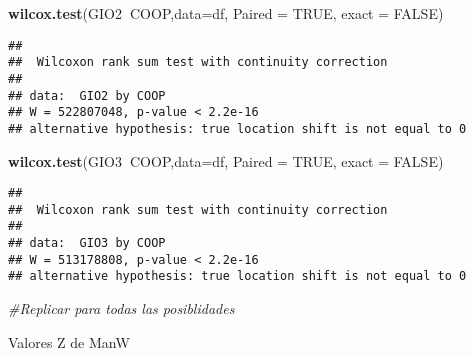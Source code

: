 \documentclass[
]{article}
\newenvironment{Shaded}{\begin{snugshade}}{\end{snugshade}}
\newcommand{\CommentTok}[1]{\textcolor[rgb]{0.56,0.35,0.01}{\textit{#1}}}
\newcommand{\DataTypeTok}[1]{\textcolor[rgb]{0.13,0.29,0.53}{#1}}
\newcommand{\KeywordTok}[1]{\textcolor[rgb]{0.13,0.29,0.53}{\textbf{#1}}}
\newcommand{\NormalTok}[1]{#1}
\newcommand{\OperatorTok}[1]{\textcolor[rgb]{0.81,0.36,0.00}{\textbf{#1}}}
\newcommand{\OtherTok}[1]{\textcolor[rgb]{0.56,0.35,0.01}{#1}}
\newcommand{\StringTok}[1]{\textcolor[rgb]{0.31,0.60,0.02}{#1}}
\begin{document}
\begin{Shaded}
\begin{Highlighting}[]
\KeywordTok{wilcox.test}\NormalTok{(GIO2}\OperatorTok{~}\NormalTok{COOP,}\DataTypeTok{data=}\NormalTok{df, }\DataTypeTok{Paired =} \OtherTok{TRUE}\NormalTok{, }\DataTypeTok{exact =} \OtherTok{FALSE}\NormalTok{)}
\end{Highlighting}
\end{Shaded}

\begin{verbatim}
## 
##  Wilcoxon rank sum test with continuity correction
## 
## data:  GIO2 by COOP
## W = 522807048, p-value < 2.2e-16
## alternative hypothesis: true location shift is not equal to 0
\end{verbatim}

\begin{Shaded}
\begin{Highlighting}[]
\KeywordTok{wilcox.test}\NormalTok{(GIO3}\OperatorTok{~}\NormalTok{COOP,}\DataTypeTok{data=}\NormalTok{df, }\DataTypeTok{Paired =} \OtherTok{TRUE}\NormalTok{, }\DataTypeTok{exact =} \OtherTok{FALSE}\NormalTok{)}
\end{Highlighting}
\end{Shaded}

\begin{verbatim}
## 
##  Wilcoxon rank sum test with continuity correction
## 
## data:  GIO3 by COOP
## W = 513178808, p-value < 2.2e-16
## alternative hypothesis: true location shift is not equal to 0
\end{verbatim}

\begin{Shaded}
\begin{Highlighting}[]
\CommentTok{#Replicar para todas las posiblidades}
\end{Highlighting}
\end{Shaded}

Valores Z de ManW

\begin{Shaded}
\end{Shaded}
\end{document}
